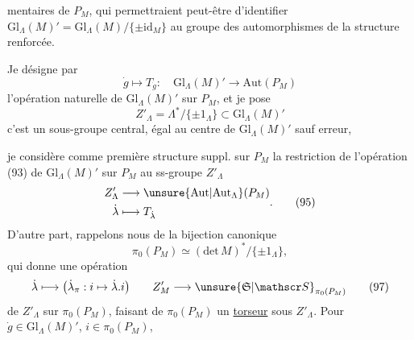 %
%
mentaires de $P_M$, qui permettraient peut-être d'identifier $\mathrm{Gl}_\Lambda(M)'=\mathrm{Gl}_\Lambda(M)/\{\pm\mathrm{id}_M\}$ au groupe des automorphismes de la structure renforcée.

Je désigne par
\[
\dot g\mapsto T_{\dot g}:\quad\mathrm{Gl}_\Lambda(M)'\longrightarrow\mathrm{Aut}(P_M)\tag*{(93)}
\]
l'opération naturelle de $\mathrm{Gl}_\Lambda(M)'$ sur $P_M$, et je  pose
\[
Z'_\Lambda=\Lambda^*/\{\pm1_\Lambda\}\subset\mathrm{Gl}_\Lambda(M)'\tag*{(94)}
\]
c'est un sous-groupe central, égal au centre de $\mathrm{Gl}_\Lambda(M)'$ sauf erreur,

je considère comme première structure suppl. sur $P_M$ la restriction de l'opération (93) de $\mathrm{Gl}_\Lambda(M)'$ sur $P_M$ au ss-groupe $Z'_\Lambda$
\[
\begin{aligned}
Z'_\Lambda&\longrightarrow\unsure{\mathrm{Aut}|\mathrm{Aut}_\Lambda}(P_M)\\
\dot\lambda&\longmapsto T_{\dot\lambda}
\end{aligned}.\tag*{(95)}
\]
D'autre part,  rappelons nous de la bijection canonique
\[
\pi_0(P_M)\simeq(\mathrm{det}\,M)^*/\{\pm1_\Lambda\},\tag*{(96)}
\]
qui donne une opération
\[
\dot\lambda\longmapsto\bigl(\dot\lambda_\pi:i\mapsto\dot\lambda.i\bigr)
\qquad Z'_M\longrightarrow\unsure{\mathfrak S|\mathscr S}_{\pi_0(P_M)}\tag*{(97)}
\]
de $Z'_\Lambda$ sur $\pi_0(P_M)$, faisant de $\pi_0(P_M)$ un \uline{torseur} sous $Z'_\Lambda$. Pour $\dot g\in\mathrm{Gl}_\Lambda(M)'$, $i\in\pi_0(P_M)$,
